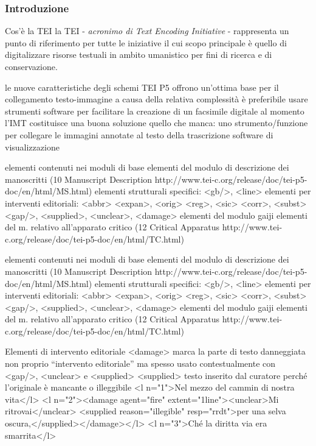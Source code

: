 \begin{frame}
    \frametitle{Introduzione}
    \addtocounter{nframe}{1}
    

    \begin{block}{Cos'è la TEI}
        la TEI - \textit{acronimo di Text Encoding Initiative} - rappresenta un punto di riferimento per tutte le iniziative il cui scopo principale è quello di digitalizzare risorse testuali in ambito umanistico per fini di ricerca e di conservazione.
    \end{block}
    
\end{frame}

le nuove caratteristiche degli schemi TEI P5 offrono un’ottima base per il collegamento testo-immagine
a causa della relativa complessità è preferibile usare strumenti software per facilitare la creazione di un facsimile digitale
al momento l’IMT costituisce una buona soluzione quello che manca:
uno strumento/funzione per collegare le immagini annotate al testo della trascrizione
software di visualizzazione


elementi contenuti nei moduli di base
elementi del modulo di descrizione dei manoscritti (10 Manuscript
Description http://www.tei-c.org/release/doc/tei-p5-doc/en/html/MS.html) elementi strutturali specifici:
<gb/>, <line>
elementi per interventi editoriali:
<abbr> <expan>, <orig> <reg>, <sic> <corr>, <subst>
<gap/>, <supplied>, <unclear>, <damage>
elementi del modulo gaiji
elementi del m. relativo all’apparato critico (12 Critical Apparatus
http://www.tei-c.org/release/doc/tei-p5-doc/en/html/TC.html)

elementi contenuti nei moduli di base
elementi del modulo di descrizione dei manoscritti (10 Manuscript
Description http://www.tei-c.org/release/doc/tei-p5-doc/en/html/MS.html) elementi strutturali specifici:
<gb/>, <line>
elementi per interventi editoriali:
<abbr> <expan>, <orig> <reg>, <sic> <corr>, <subst>
<gap/>, <supplied>, <unclear>, <damage>
elementi del modulo gaiji
elementi del m. relativo all’apparato critico (12 Critical Apparatus
http://www.tei-c.org/release/doc/tei-p5-doc/en/html/TC.html)

Elementi di intervento editoriale <damage> marca la parte di testo danneggiata
non proprio “intervento editoriale” ma spesso usato contestualmente con <gap/>, <unclear> e <supplied>
<supplied> testo inserito dal curatore perché l’originale è mancante o illeggibile
<l n="1">Nel mezzo del cammin di nostra vita</l> <l n="2"><damage agent="fire" extent="1line"><unclear>Mi ritrovai</unclear> <supplied reason="illegible" resp="rrdt">per una selva oscura,</supplied></damage></l>
<l n="3">Ché la diritta via era smarrita</l>

